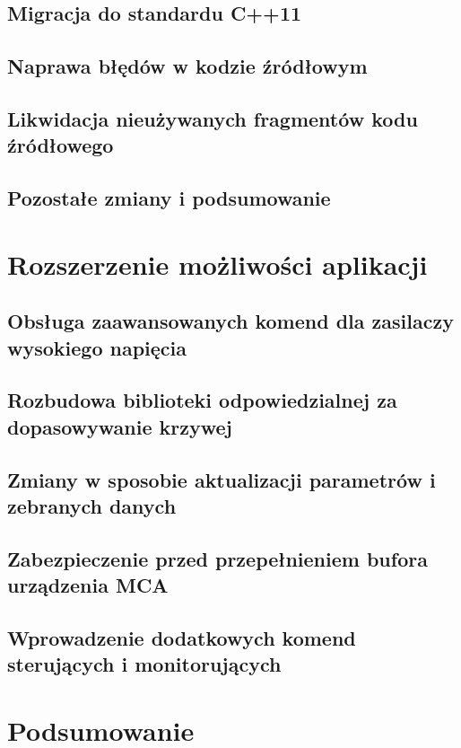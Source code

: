 \subsection{Migracja do standardu C++11}

\subsection{Naprawa błędów w kodzie źródłowym}

\subsection{Likwidacja nieużywanych fragmentów kodu źródłowego}

\subsection{Pozostałe zmiany i podsumowanie}

\section{Rozszerzenie możliwości aplikacji}
    
\subsection{Obsługa zaawansowanych komend dla zasilaczy wysokiego napięcia}
\subsection{Rozbudowa biblioteki odpowiedzialnej za dopasowywanie krzywej}
\subsection{Zmiany w sposobie aktualizacji parametrów i zebranych danych}
\subsection{Zabezpieczenie przed przepełnieniem bufora urządzenia MCA}
\subsection{Wprowadzenie dodatkowych komend sterujących i monitorujących}

\section{Podsumowanie}
